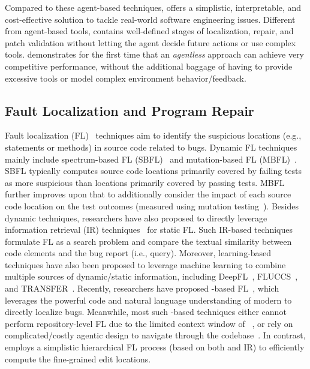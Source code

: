 Compared to these agent-based techniques, \tech offers a simplistic, interpretable, and {cost-effective} solution to tackle real-world software engineering issues. 
Different from agent-based tools, \tech contains well-defined stages of localization, repair, and patch validation without letting the \llm agent decide future actions or use complex tools.
%
\tech demonstrates for the first time that an \emph{agentless} approach can achieve very competitive performance, without the additional baggage of having to provide excessive tools or model complex environment behavior/feedback.

\subsection{Fault Localization and Program Repair}

Fault localization (FL)~\cite{wong2016survey} techniques aim to identify the suspicious locations (e.g., statements or methods) in source code related to bugs.
% 
Dynamic FL techniques mainly include spectrum-based FL (SBFL)~\cite{jones2005empirical, abreu2007accuracy, abreu2009practical} and mutation-based FL (MBFL)~\cite{papadakis2015metallaxis, moon2014ask, lou2020can}. SBFL typically computes source code locations primarily covered by failing tests as more suspicious than locations primarily covered by passing tests. MBFL further improves upon that to additionally consider the impact of each source code location on the test outcomes (measured using mutation testing~\cite{papadakis2019mutation}). Besides dynamic techniques, researchers have also proposed to directly leverage information retrieval (IR) techniques~\cite{singhal2001modern} for static FL. 
Such IR-based techniques~\cite{wang2015evaluating, saha2013improving, wang2014version} formulate FL as a search problem and compare the textual similarity between code elements and the bug report (i.e., query).
Moreover, learning-based techniques have also been proposed to leverage machine learning to combine multiple sources of dynamic/static information, including DeepFL~\cite{li2019deepfl}, FLUCCS~\cite{sohn2017fluccs}, and TRANSFER~\cite{meng2022improvingfl}. 
Recently, researchers have proposed \llm-based FL~\cite{yang2024llmao, wu2023large, qin2024agentfl, kang2024quantitative}, which leverages the powerful code and natural language understanding of modern  to directly localize bugs. Meanwhile, most such \llm-based techniques either cannot perform repository-level FL due to the limited context window of ~\cite{yang2024llmao}, or rely on complicated/costly agentic design to navigate through the codebase~\cite{kang2024quantitative, qin2024agentfl}. 
In contrast, \tech employs a simplistic hierarchical FL process (based on both  and IR) to efficiently compute the fine-grained edit locations.


